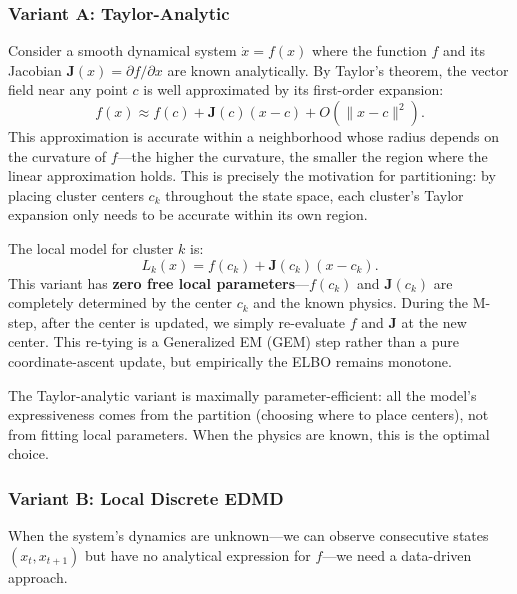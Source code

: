 \documentclass[11pt]{article}
\theoremstyle{definition}
\newcommand{\Jv}{\boldsymbol{J}}
\begin{document}
\subsubsection{Variant A: Taylor-Analytic}

Consider a smooth dynamical system $\dot{x} = f(x)$ where the function $f$ and its Jacobian $\Jv(x) = \partial f / \partial x$ are known analytically. By Taylor's theorem, the vector field near any point $c$ is well approximated by its first-order expansion:
\begin{equation}
  f(x) \approx f(c) + \Jv(c)(x - c) + O(\|x - c\|^2).
\end{equation}
This approximation is accurate within a neighborhood whose radius depends on the curvature of $f$---the higher the curvature, the smaller the region where the linear approximation holds. This is precisely the motivation for partitioning: by placing cluster centers $c_k$ throughout the state space, each cluster's Taylor expansion only needs to be accurate within its own region.

The local model for cluster $k$ is:
\begin{equation}
  L_k(x) = f(c_k) + \Jv(c_k)(x - c_k).
\end{equation}
This variant has \textbf{zero free local parameters}---$f(c_k)$ and $\Jv(c_k)$ are completely determined by the center $c_k$ and the known physics. During the M-step, after the center is updated, we simply re-evaluate $f$ and $\Jv$ at the new center. This re-tying is a Generalized EM (GEM) step rather than a pure coordinate-ascent update, but empirically the ELBO remains monotone.

The Taylor-analytic variant is maximally parameter-efficient: all the model's expressiveness comes from the partition (choosing where to place centers), not from fitting local parameters. When the physics are known, this is the optimal choice.

\subsubsection{Variant B: Local Discrete EDMD}

When the system's dynamics are unknown---we can observe consecutive states $(x_t, x_{t+1})$ but have no analytical expression for $f$---we need a data-driven approach.
\end{document}
